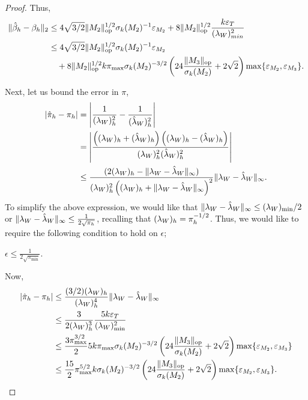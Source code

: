 \begin{proof}
Thus,
\begin{align*}
  \|\hat \beta_h - \beta_h\|_2
  &\le 4\sqrt{3/2} \|M_2\|_{\text{\rm op}}^{1/2} \sigma_k(M_2)^{-1} \varepsilon_{M_2} 
    + 8 \|M_2\|_{\text{\rm op}}^{1/2} \frac{k \varepsilon_{T}}{(\lambda_W)_{min}^2} \\
    &\le 4\sqrt{3/2} \|M_2\|_{\text{\rm op}}^{1/2} \sigma_k(M_2)^{-1} \varepsilon_{M_2} \\
  &\quad + 8 \|M_2\|_{\text{\rm op}}^{1/2} k \pi_{\max} 
    \sigma_k(M_2)^{-3/2}
      \left(24 \frac{\| {M_3} \|_{\text{\rm op}}}{\sigma_k(M_2)} + 2\sqrt{2} \right)
      \max\{\varepsilon_{M_2}, \varepsilon_{M_3}\}.
\end{align*}

Next, let us bound the error in $\pi$,
\begin{align*}
  |\hat \pi_h - \pi_h |
  &= \left| \frac{1}{(\lambda_W)_h^2} - \frac{1}{({\hat\lambda}_W)_h^2} \right| \\
  &= \left| \frac{\left( (\lambda_W)_h + ({\hat\lambda}_W)_h \right) \left( (\lambda_W)_h - ({\hat\lambda}_W)_h \right)}
  {(\lambda_W)_h^2({\hat\lambda}_W)_h^2} \right| \\
  &\le \frac{( 2(\lambda_W)_h - \|\lambda_W - {\hat\lambda}_W\|_{\infty} )}{(\lambda_W)_h^2 \left( (\lambda_W)_h + \|\lambda_W - {\hat\lambda}_W\|_{\infty} \right)^2} \|\lambda_W - {\hat\lambda}_W\|_{\infty}.
\end{align*}
To simplify the above expression, we would like that $\|\lambda_W - {\hat\lambda}_W
\|_{\infty} \le (\lambda_W)_{\min}/2$ or $\|\lambda_W - {\hat\lambda}_W \|_{\infty} \le
\frac{1}{2\sqrt{\pi_h}}$, recalling that $(\lambda_W)_h = \pi_h^{-1/2}$. Thus,
we would like to require the following condition to hold on $\epsilon$;  
\begin{condition}
  $\epsilon \le \frac{1}{2\sqrt{\pi_{\min}}}$.
\end{condition}

Now,
\begin{align*}
  |\hat \pi_h - \pi_h |
  &\le \frac{(3/2)(\lambda_W)_h}{(\lambda_W)_h^4}
  \|\lambda_W - {\hat\lambda}_W\|_{\infty} \\
  &\le \frac{3}{2(\lambda_W)_h^3} \frac{5 k \varepsilon_{T}}{(\lambda_W)_{\min}^2} \\
  &\le \frac{3 \pi_{\max}^{3/2}}{2} 5 k \pi_{\max} 
    \sigma_k(M_2)^{-3/2}
    \left(24 \frac{\| {M_3} \|_{\text{\rm op}}}{\sigma_k(M_2)} + 2\sqrt{2} \right) \max\{\varepsilon_{M_2}, \varepsilon_{M_3}\} \\
    &\le \frac{15}{2} \pi_{\max}^{5/2} k 
    \sigma_k(M_2)^{-3/2}
    \left(24 \frac{\| {M_3} \|_{\text{\rm op}}}{\sigma_k(M_2)} + 2\sqrt{2} \right) \max\{\varepsilon_{M_2}, \varepsilon_{M_3}\}.
\end{align*}


\end{proof}
